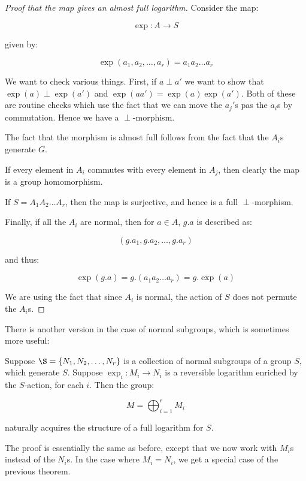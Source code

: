 \documentclass[a4paper]{amsart}
\begin{document}
\begin{proof}[Proof that the map gives an almost full logarithm]
  Consider the map:

  $$\exp:A \to S$$

  given by:

  $$\exp(a_1,a_2,\ldots,a_r) = a_1a_2\ldots a_r$$

  We want to check various things. First, if $a \perp a'$ we want to
  show that $\exp(a) \perp \exp(a')$ and $\exp(aa') =
  \exp(a)\exp(a')$. Both of these are routine checks which use the
  fact that we can move the $a_j'$s pas the $a_i$s by
  commutation. Hence we have a $\perp$-morphism.

  The fact that the morphism is almost full follows from the fact
  that the $A_i$s generate $G$.

  If every element in $A_i$ commutes with every element in $A_j$, then
  clearly the map is a group homomorphism.

  If $S = A_1A_2 \ldots A_r$, then the map is surjective, and hence is
  a full $\perp$-morphism.

  Finally, if all the $A_i$ are normal, then for $a \in A$, $g.a$ is
  described as:

  $$(g.a_1, g.a_2, \ldots, g.a_r)$$

  and thus:

  $$\exp(g.a) = g.(a_1a_2 \ldots a_r) = g.\exp(a)$$

  We are using the fact that since $A_i$ is normal, the action of $S$
  does not permute the $A_i$s.
\end{proof}

There is another version in the case of normal subgroups, which is
sometimes more useful:

\begin{theorem}
  Suppose $\S = \{ N_1 ,N_2, \ldots, N_r \}$ is a collection of normal
  subgroups of a group $S$, which generate $S$. Suppose $\exp_i:M_i \to N_i$
  is a reversible logarithm enriched by the $S$-action, for each $i$.
  Then the group:

  $$M = \bigoplus_{i=1}^r M_i$$

  naturally acquires the structure of a full logarithm for $S$.
\end{theorem}

The proof is essentially the same as before, except that we now work
with $M_i$s instead of the $N_i$s. In the case where $M_i = N_i$, we
get a special case of the previous theorem.
\end{document}
